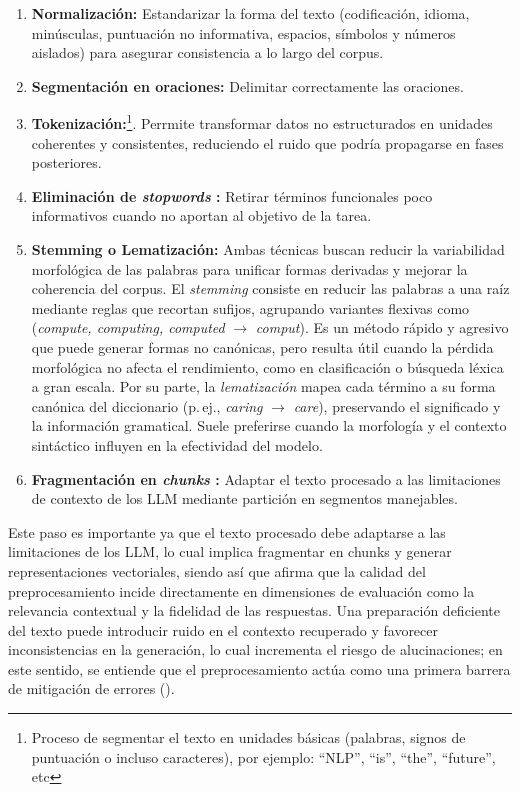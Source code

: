 \begin{enumerate}
    \item \textbf{Normalización:} Estandarizar la forma del texto (codificación, idioma, minúsculas, puntuación no informativa, espacios, símbolos y números aislados) para 
    asegurar consistencia a lo largo del corpus.
    \item \textbf{Segmentación en oraciones:} Delimitar correctamente las oraciones.
    \item \textbf{Tokenización:}\footnote{Proceso de segmentar el texto en unidades básicas (palabras, signos de puntuación o incluso caracteres), 
    por ejemplo: “NLP”, “is”, “the”, “future”, etc}. 
    Perrmite transformar datos no estructurados en unidades coherentes y consistentes, reduciendo el ruido que podría propagarse en fases posteriores.
    \item \textbf{Eliminación de \textit{stopwords} :} Retirar términos funcionales poco informativos cuando no aportan al objetivo de la tarea.
    \item \textbf{Stemming o Lematización:} Ambas técnicas buscan reducir la variabilidad morfológica de las palabras para unificar formas derivadas y mejorar la coherencia del corpus. 
      El \emph{stemming} consiste en reducir las palabras a una raíz mediante reglas que recortan sufijos, agrupando variantes flexivas como 
      (\emph{compute, computing, computed} $\rightarrow$ \emph{comput}). Es un método rápido y agresivo que puede generar formas no canónicas, pero resulta útil cuando
       la pérdida morfológica 
      no afecta el rendimiento, como en clasificación o búsqueda léxica a gran escala.  
      Por su parte, la \emph{lematización} mapea cada término a su forma canónica del diccionario (p.\,ej., \emph{caring} $\rightarrow$ \emph{care}), preservando el 
      significado y la información gramatical. 
      Suele preferirse cuando la morfología y el contexto sintáctico influyen en la efectividad del modelo.
     \item \textbf{Fragmentación en \textit{chunks} :} Adaptar el texto procesado a las limitaciones de contexto de los LLM mediante partición en segmentos manejables.
\end{enumerate}

Este paso es importante ya que el texto procesado debe adaptarse a las limitaciones de los LLM, lo cual implica fragmentar en chunks y generar representaciones 
vectoriales, siendo así que \textcite{knollmeyer2024benchmarking} 
afirma que la calidad del preprocesamiento incide directamente en dimensiones de evaluación como la relevancia contextual y la fidelidad de las respuestas. Una preparación deficiente del texto puede introducir ruido en el contexto recuperado 
y favorecer inconsistencias en la generación, lo cual incrementa el riesgo de alucinaciones; en este sentido, se entiende que el preprocesamiento actúa como una primera barrera de mitigación de errores (\textcite{zhang2025hallucination}).

